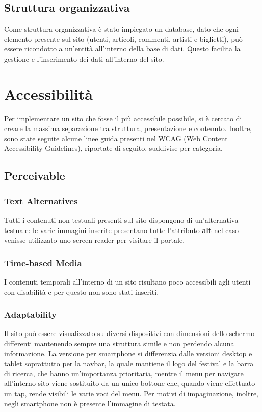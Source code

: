\documentclass[10pt, a4paper]{article}
\begin{document}
\subsection{Struttura organizzativa}
Come struttura organizzativa è stato impiegato un database, dato che ogni elemento presente sul sito (utenti, articoli, commenti, artisti e biglietti), può essere ricondotto a un'entità all'interno della base di dati. Questo facilita la gestione e l'inserimento dei dati all'interno del sito.
\section{Accessibilità}
Per implementare un sito che fosse il più accessibile possibile, si è cercato di creare la massima separazione tra struttura, presentazione e contenuto. Inoltre, sono state seguite alcune linee guida presenti nel WCAG (Web Content Accessibility Guidelines), riportate di seguito, suddivise per categoria.

\subsection{Perceivable}

\subsubsection{Text Alternatives}
Tutti i contenuti non testuali presenti sul sito dispongono di un'alternativa testuale: le varie immagini inserite presentano tutte l'attributo \textbf{alt} nel caso venisse utilizzato uno screen reader per visitare il portale.

\subsubsection{Time-based Media}
I contenuti temporali all'interno di un sito risultano poco accessibili agli utenti con disabilità e per questo non sono stati inseriti.

\subsubsection{Adaptability}
Il sito può essere visualizzato su diversi dispositivi con dimensioni dello schermo differenti mantenendo sempre una struttura simile e non perdendo alcuna informazione. La versione per smartphone si differenzia dalle versioni desktop e tablet soprattutto per la navbar, la quale mantiene il logo del festival e la barra di ricerca, che hanno un'importanza prioritaria, mentre il menu per navigare all'interno sito viene sostituito da un unico bottone che, quando viene effettuato un tap, rende visibili le varie voci del menu. Per motivi di impaginazione, inoltre, negli smartphone non è presente l’immagine di testata.
\end{document}
